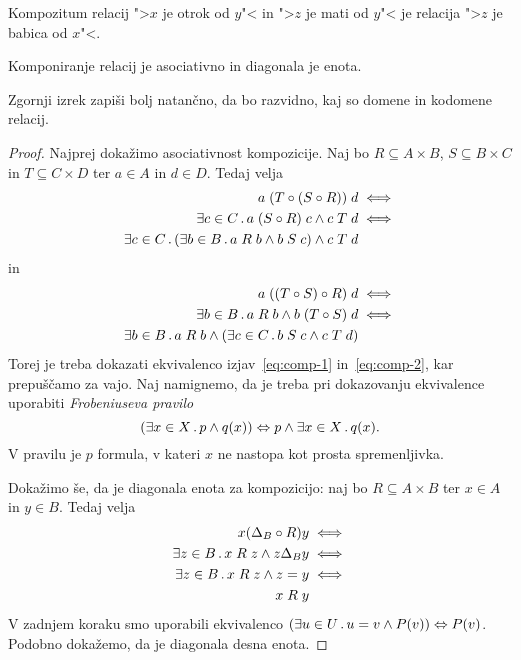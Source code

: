 \begin{zgled}
  Kompozitum relacij ">$x$ je otrok od $y$"< in ">$z$ je mati od $y$"< je relacija
  ">$z$ je babica od $x$"<.
\end{zgled}

\begin{izrek}
  Komponiranje relacij je asociativno in diagonala je enota.
\end{izrek}

\begin{vaja}
  Zgornji izrek zapiši bolj natančno, da bo razvidno, kaj so domene in kodomene relacij.
\end{vaja}

\begin{proof}
  Najprej dokažimo asociativnost kompozicije.
  Naj bo $R \subseteq A \times B$, $S \subseteq B \times C$ in $T \subseteq C \times D$ ter $a \in A$ in $d \in D$. Tedaj velja
  \begin{align}
    a \rel{(T \circ (S \circ R))} d &\iff  \notag \\
    \some{c \in C} a \rel{(S \circ R)} c \land c \rel{T} d &\iff \notag \\
    \some{c \in C} (\some{b \in B} a \rel{R} b \land b \rel{S} c) \land c \rel{T} d \label{eq:comp-1}
  \end{align}
  in
  \begin{align}
    a \rel{((T \circ S) \circ R)} d &\iff \notag \\
    \some{b \in B} a \rel{R} b \land b \rel{(T \circ S)} d &\iff \notag \\
    \some{b \in B} a \rel{R} b \land (\some{c \in C} b \rel{S} c \land c \rel{T} d) \label{eq:comp-2}
  \end{align}
  Torej je treba dokazati ekvivalenco izjav~\eqref{eq:comp-1} in~\eqref{eq:comp-2}, kar prepuščamo za vajo. Naj namignemo, da je treba pri dokazovanju ekvivalence uporabiti \emph{Frobeniuseva pravilo}
  \begin{equation*}
    (\some{x \in X} p \land q(x)) \liff p \land \some{x \in X} q(x).
  \end{equation*}
  V pravilu je $p$ formula, v kateri $x$ ne nastopa kot prosta spremenljivka.

  Dokažimo še, da je diagonala enota za kompozicijo: naj bo $R \subseteq A \times B$ ter $x \in A$ in $y \in B$. Tedaj velja
  \begin{align*}
    x (\diag[B] \circ R) y &\iff \\
    \some{z \in B} x \rel{R} z \land z \diag[B] y  &\iff \\
    \some{z \in B} x \rel{R} z \land z = y &\iff \\
    x \rel{R} y
  \end{align*}
  V zadnjem koraku smo uporabili ekvivalenco $(\some{u \in U} u = v \land P(v)) \liff P(v)$. Podobno dokažemo, da je diagonala desna enota.
\end{proof}

